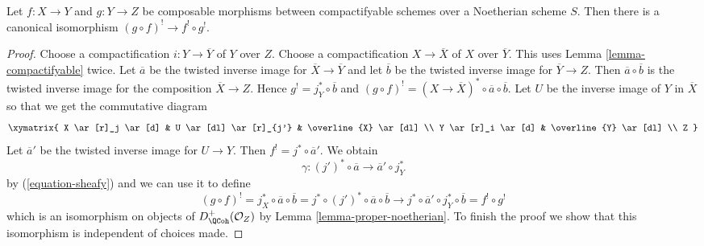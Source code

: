 \begin{lemma}
\label{lemma-upper-shriek-composition}
Let $f : X \to Y$ and $g : Y \to Z$ be composable
morphisms between compactifyable
schemes over a Noetherian scheme $S$. Then there is a canonical
isomorphism $(g \circ f)^! \to f^! \circ g^!$.
\end{lemma}

\begin{proof}
Choose a compactification $i : Y \to \overline{Y}$ of $Y$ over $Z$.
Choose a compactification $X \to \overline{X}$ of $X$ over
$\overline{Y}$. This uses Lemma \ref{lemma-compactifyable} twice.
Let $\overline{a}$ be the twisted inverse image for
$\overline{X} \to \overline{Y}$ and let $\overline{b}$
be the twisted inverse image for $\overline{Y} \to Z$.
Then $\overline{a} \circ \overline{b}$ is the twisted inverse
image for the composition $\overline{X} \to Z$.
Hence $g^! = j_Y^* \circ \overline{b}$ and
$(g \circ f)^! = (X \to \overline{X})^* \circ \overline{a} \circ \overline{b}$.
Let $U$ be the inverse image of $Y$ in $\overline{X}$
so that we get the commutative diagram
$$
\xymatrix{
X \ar[r]_j \ar[d] & U \ar[dl] \ar[r]_{j'} & \overline{X} \ar[dl] \\
Y \ar[r]_i \ar[d] & \overline{Y} \ar[dl] \\
Z
}
$$
Let $\overline{a}'$ be the twisted inverse image for $U \to Y$.
Then $f^! = j^* \circ \overline{a}'$. We obtain
$$
\gamma : (j')^* \circ \overline{a} \to \overline{a}' \circ j_Y^*
$$
by (\ref{equation-sheafy}) and we can use it to define
$$
(g \circ f)^! =
j_X^* \circ \overline{a} \circ \overline{b} =
j^* \circ (j')^* \circ \overline{a} \circ \overline{b}
\to
j^* \circ \overline{a}' \circ j_Y^* \circ \overline{b} =
f^! \circ g^!
$$
which is an isomorphism on objects of $D_\QCoh^+(\mathcal{O}_Z)$ by
Lemma \ref{lemma-proper-noetherian}. To finish the proof we show that
this isomorphism is independent of choices made.


\end{proof}
